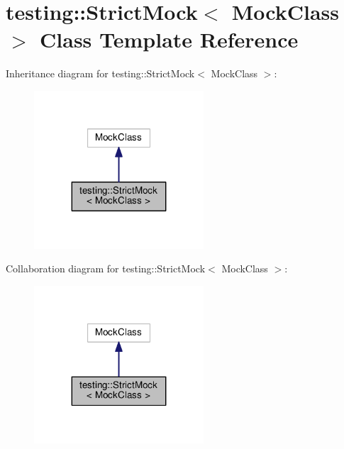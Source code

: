\hypertarget{classtesting_1_1StrictMock}{}\section{testing\+:\+:Strict\+Mock$<$ Mock\+Class $>$ Class Template Reference}
\label{classtesting_1_1StrictMock}


Inheritance diagram for testing\+:\+:Strict\+Mock$<$ Mock\+Class $>$\+:\nopagebreak
\begin{figure}[H]
\begin{center}
\leavevmode
\includegraphics[width=179pt]{classtesting_1_1StrictMock__inherit__graph}
\end{center}
\end{figure}


Collaboration diagram for testing\+:\+:Strict\+Mock$<$ Mock\+Class $>$\+:\nopagebreak
\begin{figure}[H]
\begin{center}
\leavevmode
\includegraphics[width=179pt]{classtesting_1_1StrictMock__coll__graph}
\end{center}
\end{figure}
